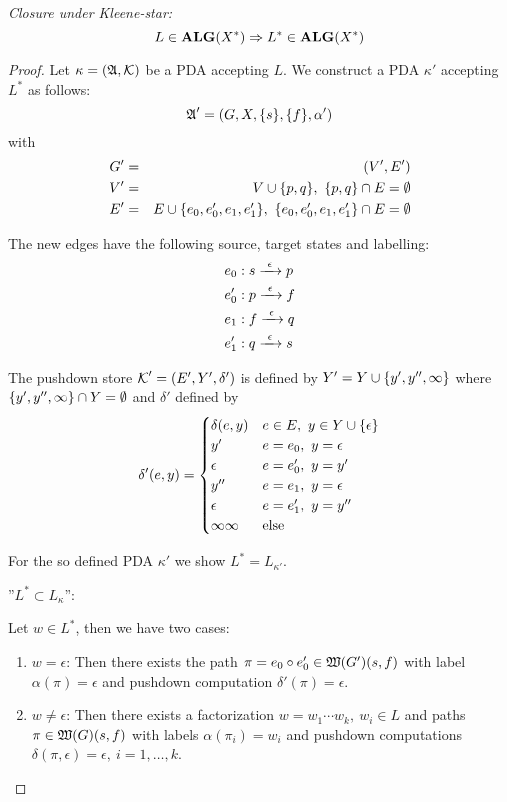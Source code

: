 {\em Closure under Kleene-star:}
\[ L \in \mbox{{\bf ALG}}(X^*) \Rightarrow L^* \in \mbox{{\bf ALG}}(X^*) \]
\begin{proof}
Let $\kappa = (\mbox{$\mathfrak{A}$}, \mbox{$\mathcal{K}$})$ be a PDA accepting $L$. We construct a PDA
$\kappa'$ accepting $L^*$ as follows:
\[ \mbox{$\mathfrak{A}$}' = (G, X, \mbox{$\{s\}$}, \mbox{$\{f\}$}, \alpha')\]
with
\begin{eqnarray*}
G' &=& (V', E') \\
V' &=& V \cup \mbox{$\{p, q\}$},\ \mbox{$\{p, q\}$} \cap E = \emptyset \\
E' &=& E \cup \mbox{$\{e_0, e_0', e_1, e_1'\}$},\ \mbox{$\{e_0, e_0', e_1, e_1'\}$} \cap E
= \emptyset \\
\end{eqnarray*}

The new edges have the following source, target states and labelling:
\begin{eqnarray*}
& e_0: s \xrightarrow{\ {\epsilon}\ } p \\
& e_0': p \xrightarrow{\ {\epsilon}\ } f \\
& e_1: f \xrightarrow{\ {\epsilon}\ } q \\
& e_1': q \xrightarrow{\ {\epsilon}\ } s \\
\end{eqnarray*}

\begin{center} 

\end{center}

The pushdown store $\mbox{$\mathcal{K}$}' = (E', Y', \delta')$ is defined by $Y' = Y
\cup \mbox{$\{y', y'', \infty\}$}$ where $\mbox{$\{y', y'', \infty\}$} \cap Y =
\emptyset$ and $\delta'$ defined by
\[ \delta'(e, y) = \begin{cases}
\delta(e, y)		& e \in E,\ y \in  Y \cup \mbox{$\{\epsilon\}$} \\
y'							& e = e_0,\ y = \epsilon \\
\epsilon				& e = e_0',\ y = y' \\
y''							& e = e_1,\ y = \epsilon \\
\epsilon				& e = e_1',\ y = y'' \\
\infty\infty		& \text{else}
\end{cases}\]

For the so defined PDA $\kappa'$ we show $L^* = L_{\kappa'}$.

''$L^* \subset L_{\kappa}$'':

Let $w \in L^*$, then we have two cases:

\begin{enumerate}
  \item $w = \epsilon$: Then there exists the path $\pi = e_0 \circ e_0' \in
  \mbox{$\mathfrak{W}({G'})$}(s, f)$ with label $\alpha(\pi) = \epsilon$ and
  pushdown computation $\delta'(\pi) = \epsilon$.
  \item $w \neq \epsilon$: Then there exists a factorization $w = w_1 \cdots
  w_k,\ w_i \in L$ and paths $\pi \in \mbox{$\mathfrak{W}({G})$}(s, f)$ with labels
  $\alpha(\pi_i) = w_i$ and pushdown computations $\delta(\pi, \epsilon) =
  \epsilon,\ i = 1, \ldots, k$.
  

\end{enumerate}
\end{proof}
